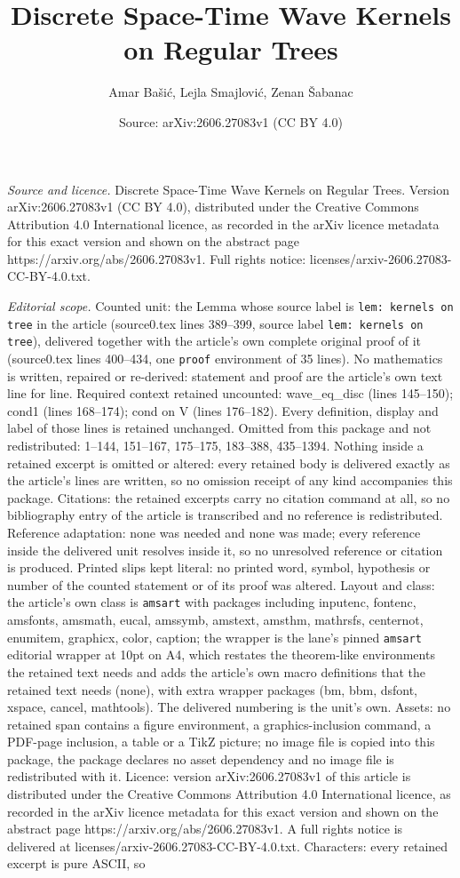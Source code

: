\documentclass[10pt,a4paper]{amsart}
\title[Discrete Space-Time Wave Kernels on Regular Trees]{Discrete Space-Time Wave Kernels on Regular Trees}
\author{Amar Ba\v{s}i\'c, Lejla Smajlovi\'c, Zenan \v{S}abanac}
\date{Source: arXiv:2606.27083v1 (CC BY 4.0)}
\begin{document}
\maketitle

\noindent\emph{Source and licence.} Discrete Space-Time Wave Kernels on Regular Trees. Version arXiv:2606.27083v1 (CC BY 4.0), distributed under the Creative Commons Attribution 4.0 International licence, as recorded in the arXiv licence metadata for this exact version and shown on the abstract page https://arxiv.org/abs/2606.27083v1. Full rights notice: licenses/arxiv-2606.27083-CC-BY-4.0.txt.\par\smallskip

\noindent\textit{Editorial scope.} Counted unit: the Lemma whose source label is \texttt{lem: kernels on tree} in the article (source0.tex lines 389--399, source label \texttt{lem: kernels on tree}), delivered together with the article's own complete original proof of it (source0.tex lines 400--434, one \texttt{proof} environment of 35 lines). No mathematics is written, repaired or re-derived: statement and proof are the article's own text line for line. Required context retained uncounted: wave\_eq\_disc (lines 145--150); cond1 (lines 168--174); cond on V (lines 176--182). Every definition, display and label of those lines is retained unchanged. Omitted from this package and not redistributed: 1--144, 151--167, 175--175, 183--388, 435--1394. Nothing inside a retained excerpt is omitted or altered: every retained body is delivered exactly as the article's lines are written, so no omission receipt of any kind accompanies this package. Citations: the retained excerpts carry no citation command at all, so no bibliography entry of the article is transcribed and no reference is redistributed. Reference adaptation: none was needed and none was made; every reference inside the delivered unit resolves inside it, so no unresolved reference or citation is produced. Printed slips kept literal: no printed word, symbol, hypothesis or number of the counted statement or of its proof was altered. Layout and class: the article's own class is \texttt{amsart} with packages including inputenc, fontenc, amsfonts, amsmath, eucal, amssymb, amstext, amsthm, mathrsfs, centernot, enumitem, graphicx, color, caption; the wrapper is the lane's pinned \texttt{amsart} editorial wrapper at 10pt on A4, which restates the theorem-like environments the retained text needs and adds the article's own macro definitions that the retained text needs (none), with extra wrapper packages (bm, bbm, dsfont, xspace, cancel, mathtools). The delivered numbering is the unit's own. Assets: no retained span contains a figure environment, a graphics-inclusion command, a PDF-page inclusion, a table or a TikZ picture; no image file is copied into this package, the package declares no asset dependency and no image file is redistributed with it. Licence: version arXiv:2606.27083v1 of this article is distributed under the Creative Commons Attribution 4.0 International licence, as recorded in the arXiv licence metadata for this exact version and shown on the abstract page https://arxiv.org/abs/2606.27083v1. A full rights notice is delivered at licenses/arxiv-2606.27083-CC-BY-4.0.txt. Characters: every retained excerpt is pure ASCII, so 
\end{document}
